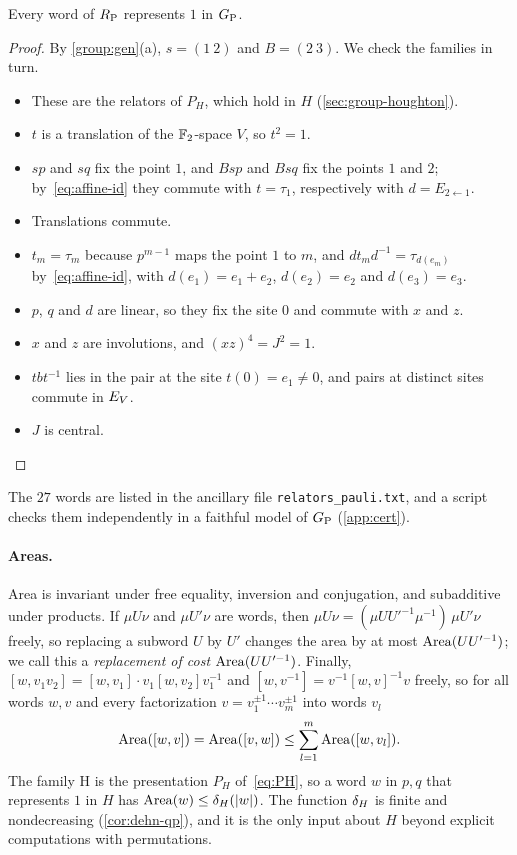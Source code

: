 \begin{lemma}\label{lem:RP-valid}
Every word of $R_{\mathrm P}$ represents $1$ in $G_{\mathrm P}$.
\end{lemma}

\begin{proof}
By \cref{group:gen}(a), $s=(1\ 2)$ and $B=(2\ 3)$. We check the families in turn.
\begin{itemize}[itemsep=0pt,leftmargin=2em]
\item[\textsf{H}] These are the relators of $P_H$, which hold in $H$ (\cref{sec:group-houghton}).
\item[\textsf{Q}] $t$ is a translation of the $\mathbb F_2$-space $V$, so $t^2=1$.
\item[\textsf{S}] $sp$ and $sq$ fix the point $1$, and $Bsp$ and $Bsq$ fix the points $1$ and $2$; by~\eqref{eq:affine-id} they commute
with $t=\tau_1$, respectively with $d=E_{2\leftarrow1}$.
\item[\textsf{C}] Translations commute.
\item[\textsf{A}] $t_m=\tau_m$ because $p^{m-1}$ maps the point $1$ to $m$, and $dt_md^{-1}=\tau_{d(e_m)}$ by~\eqref{eq:affine-id}, with
$d(e_1)=e_1+e_2$, $d(e_2)=e_2$ and $d(e_3)=e_3$.
\item[\textsf{Z}] $p$, $q$ and $d$ are linear, so they fix the site $0$ and commute with $x$ and $z$.
\item[\textsf{L}] $x$ and $z$ are involutions, and $(xz)^4=J^2=1$.
\item[\textsf{P}] $tbt^{-1}$ lies in the pair at the site $t(0)=e_1\ne0$, and pairs at distinct sites commute in $E_V$.
\item[\textsf{K}] $J$ is central.\qedhere
\end{itemize}
\end{proof}

The $27$ words are listed in the ancillary file \texttt{relators\_pauli.txt}, and a script checks them independently in a faithful model
of $G_{\mathrm P}$ (\cref{app:cert}).

\paragraph{Areas.} Area is invariant under free equality, inversion and conjugation, and subadditive under products. If $\mu U\nu$ and
$\mu U'\nu$ are words, then $\mu U\nu=(\mu UU'^{-1}\mu^{-1})\,\mu U'\nu$ freely, so replacing a subword $U$ by $U'$ changes the area by at
most $\operatorname{Area}(UU'^{-1})$; we call this a \emph{replacement of cost $\operatorname{Area}(UU'^{-1})$}. Finally, $[w,v_1v_2]=[w,v_1]\cdot v_1[w,v_2]v_1^{-1}$
and $[w,v^{-1}]=v^{-1}[w,v]^{-1}v$ freely, so for all words $w,v$ and every factorization $v=v_1^{\pm1}\cdots v_m^{\pm1}$ into words $v_l$
\begin{equation}\label{eq:pair-comm}
\operatorname{Area}([w,v])=\operatorname{Area}([v,w])\le\sum_{l=1}^m\operatorname{Area}([w,v_l]).
\end{equation}
The family \textsf{H} is the presentation $P_H$ of~\eqref{eq:PH}, so a word $w$ in $p,q$ that represents $1$ in $H$ has
$\operatorname{Area}(w)\le\delta_{H}(|w|)$. The function $\delta_{H}$ is finite and nondecreasing (\cref{cor:dehn-qp}), and it is the only input about $H$ beyond
explicit computations with permutations.

